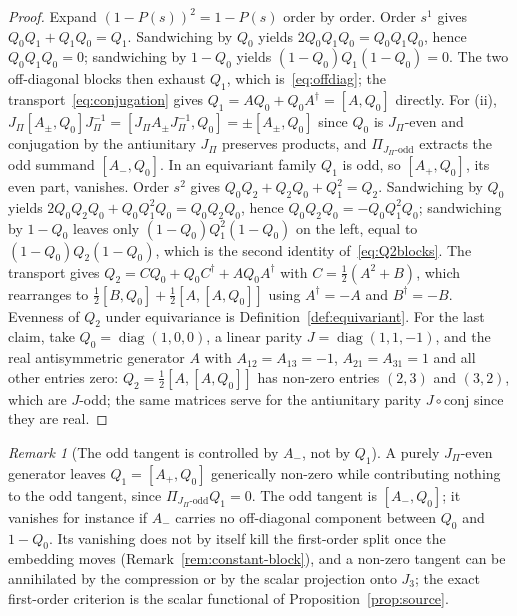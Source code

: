 \documentclass[11pt]{article}
\theoremstyle{definition}
\theoremstyle{remark}
\newtheorem{remark}{Remark}
\newcommand{\JPi}{J_{\Pi}}
\newcommand{\Jthree}{J_{3}}
\newcommand{\diag}{\operatorname{diag}}
\newcommand{\Podd}{\Pi_{\JPi\text{-odd}}}
\begin{document}
    \begin{proof}
      Expand $(1-P(s))^2 = 1 - P(s)$ order by order.
      Order $s^1$ gives $Q_0 Q_1 + Q_1 Q_0 = Q_1$.
      Sandwiching by $Q_0$ yields $2 Q_0 Q_1 Q_0 = Q_0 Q_1 Q_0$, hence $Q_0 Q_1 Q_0 = 0$; sandwiching by $1-Q_0$ yields
      $(1-Q_0) Q_1 (1-Q_0) = 0$.
      The two off-diagonal blocks then exhaust $Q_1$, which is~\eqref{eq:offdiag}; the transport~\eqref{eq:conjugation}
      gives $Q_1 = A Q_0 + Q_0 A^{\dagger} = [A, Q_0]$ directly.
      For (ii), $\JPi [A_{\pm}, Q_0] \JPi^{-1} = [\JPi A_{\pm}\JPi^{-1}, Q_0] = \pm [A_{\pm}, Q_0]$ since $Q_0$ is
      $\JPi$-even
      and conjugation by the antiunitary $\JPi$ preserves products, and $\Podd$ extracts the odd summand $[A_-, Q_0]$.
      In an equivariant family $Q_1$ is odd, so $[A_+, Q_0]$, its even part, vanishes.
      Order $s^2$ gives $Q_0 Q_2 + Q_2 Q_0 + Q_1^2 = Q_2$.
      Sandwiching by $Q_0$ yields $2 Q_0 Q_2 Q_0 + Q_0 Q_1^2 Q_0 = Q_0 Q_2 Q_0$, hence $Q_0 Q_2 Q_0 = -Q_0 Q_1^2 Q_0$;
      sandwiching by $1-Q_0$ leaves only $(1-Q_0) Q_1^2 (1-Q_0)$ on the left, equal to $(1-Q_0) Q_2 (1-Q_0)$, which is
      the
      second identity of~\eqref{eq:Q2blocks}.
      The transport gives $Q_2 = C Q_0 + Q_0 C^{\dagger} + A Q_0 A^{\dagger}$ with $C = \tfrac12(A^2 + B)$, which
      rearranges to $\tfrac12 [B, Q_0] + \tfrac12 [A, [A, Q_0]]$ using $A^{\dagger} = -A$ and $B^{\dagger} = -B$.
      Evenness of $Q_2$ under equivariance is Definition~\ref{def:equivariant}.
      For the last claim, take $Q_0 = \diag(1, 0, 0)$, a linear parity $J = \diag(1, 1, -1)$, and the real antisymmetric
      generator $A$ with $A_{12} = A_{13} = -1$, $A_{21} = A_{31} = 1$ and all other entries zero: $Q_2 = \tfrac12
      [A,[A,Q_0]]$
      has non-zero entries $(2,3)$ and $(3,2)$, which are $J$-odd; the same matrices serve for the antiunitary parity
      $J \circ \mathrm{conj}$ since they are real.
    \end{proof}

    \begin{remark}[The odd tangent is controlled by $A_-$, not by $Q_1$]
      \label{rem:dead}
      A purely $\JPi$-even generator leaves $Q_1 = [A_+, Q_0]$ generically non-zero while contributing nothing to the
      odd
      tangent, since $\Podd Q_1 = 0$.
      The odd tangent is $[A_-, Q_0]$; it vanishes for instance if $A_-$ carries no off-diagonal component between $Q_0$
      and $1 - Q_0$.
      Its vanishing does not by itself kill the first-order split once the embedding moves
      (Remark~\ref{rem:constant-block}), and a non-zero tangent can be annihilated by the compression or by the scalar
      projection onto $\Jthree$; the exact first-order criterion is the scalar
      functional of Proposition~\ref{prop:source}.
    \end{remark}
\end{document}
